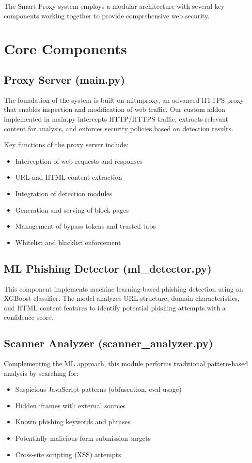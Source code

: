 The Smart Proxy system employs a modular architecture with several key components working together to provide comprehensive web security.

\section{Core Components}

\subsection{Proxy Server (main.py)}
The foundation of the system is built on mitmproxy, an advanced HTTPS proxy that enables inspection and modification of web traffic. Our custom addon implemented in main.py intercepts HTTP/HTTPS traffic, extracts relevant content for analysis, and enforces security policies based on detection results.

Key functions of the proxy server include:
\begin{itemize}
    \item Interception of web requests and responses
    \item URL and HTML content extraction
    \item Integration of detection modules
    \item Generation and serving of block pages
    \item Management of bypass tokens and trusted tabs
    \item Whitelist and blacklist enforcement
\end{itemize}

\subsection{ML Phishing Detector (ml\_detector.py)}
This component implements machine learning-based phishing detection using an XGBoost classifier. The model analyzes URL structure, domain characteristics, and HTML content features to identify potential phishing attempts with a confidence score.

\subsection{Scanner Analyzer (scanner\_analyzer.py)}
Complementing the ML approach, this module performs traditional pattern-based analysis by searching for:
\begin{itemize}
    \item Suspicious JavaScript patterns (obfuscation, eval usage)
    \item Hidden iframes with external sources
    \item Known phishing keywords and phrases
    \item Potentially malicious form submission targets
    \item Cross-site scripting (XSS) attempts
\end{itemize}

